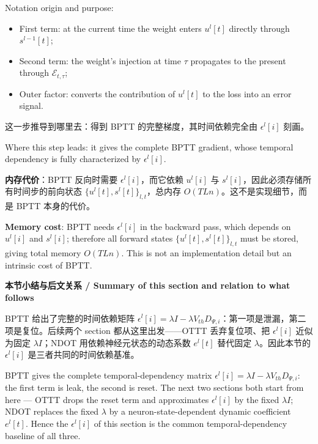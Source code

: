 \documentclass[journal,12pt,onecolumn]{IEEEtran}
\begin{document}
Notation origin and purpose:
\begin{itemize}[leftmargin=1.5em,itemsep=2pt]
\item First term: at the current time the weight enters $u^l[t]$ directly through $s^{l-1}[t]$;
\item Second term: the weight's injection at time $\tau$ propagates to the present through $\mathcal{E}_{t,\tau}$;
\item Outer factor: converts the contribution of $u^l[t]$ to the loss into an error signal.
\end{itemize}

这一步推导到哪里去：得到 BPTT 的完整梯度，其时间依赖完全由 $\epsilon^l[i]$ 刻画。

Where this step leads: it gives the complete BPTT gradient, whose temporal dependency is fully characterized by $\epsilon^l[i]$.

\textbf{内存代价}：BPTT 反向时需要 $\epsilon^l[i]$，而它依赖 $u^l[i]$ 与 $s^l[i]$，因此必须存储所有时间步的前向状态 $\{u^l[t], s^l[t]\}_{l,t}$，总内存 $O(TLn)$。这不是实现细节，而是 BPTT 本身的代价。

\textbf{Memory cost}: BPTT needs $\epsilon^l[i]$ in the backward pass, which depends on $u^l[i]$ and $s^l[i]$; therefore all forward states $\{u^l[t], s^l[t]\}_{l,t}$ must be stored, giving total memory $O(TLn)$. This is not an implementation detail but an intrinsic cost of BPTT.

\medskip\noindent\textbf{本节小结与后文关系 / Summary of this section and relation to what follows}

BPTT 给出了完整的时间依赖矩阵 $\epsilon^l[i] = \lambda I - \lambda V_{th} D_{\Psi,i}$：第一项是泄漏，第二项是复位。后续两个 section 都从这里出发——OTTT 丢弃复位项、把 $\epsilon^l[i]$ 近似为固定 $\lambda I$；NDOT 用依赖神经元状态的动态系数 $e^l[t]$ 替代固定 $\lambda$。因此本节的 $\epsilon^l[i]$ 是三者共同的时间依赖基准。

BPTT gives the complete temporal-dependency matrix $\epsilon^l[i] = \lambda I - \lambda V_{th} D_{\Psi,i}$: the first term is leak, the second is reset. The next two sections both start from here — OTTT drops the reset term and approximates $\epsilon^l[i]$ by the fixed $\lambda I$; NDOT replaces the fixed $\lambda$ by a neuron-state-dependent dynamic coefficient $e^l[t]$. Hence the $\epsilon^l[i]$ of this section is the common temporal-dependency baseline of all three.


\end{document}
